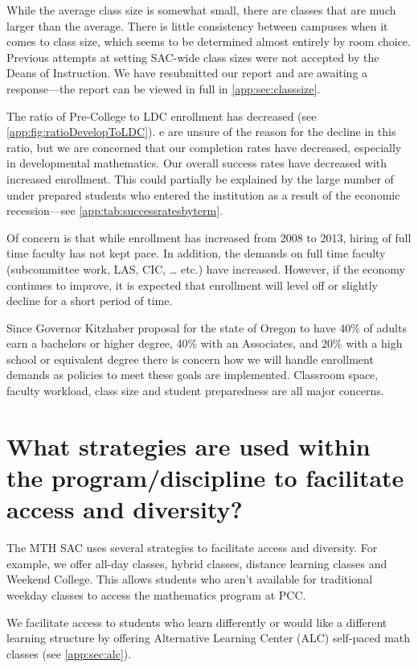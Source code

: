 While the average class size is somewhat small, there are classes that are much
larger than the average. There is little consistency between campuses when it
comes to class size, which seems to be determined almost entirely by room
choice. Previous attempts at setting SAC-wide class sizes were not accepted by
the Deans of Instruction. We have resubmitted our report and are awaiting a
response---the report \label{needs:page:classsize} can be viewed in full in \vref{app:sec:classsize}.

The ratio of Pre-College to LDC enrollment has decreased (see
\vref{app:fig:ratioDevelopToLDC}). e are unsure of the reason for the decline
in this ratio, but we are concerned that our completion rates have decreased,
especially in developmental mathematics. Our overall success rates have
decreased with increased enrollment.  This could partially be explained by the
large number of under prepared students who entered the institution as a result
of the economic recession---see \vref{app:tab:successratesbyterm}.

Of concern is that while enrollment has increased from 2008 to 2013, hiring of
full time faculty has not kept pace. In addition, the demands on full time
faculty (subcommittee work, LAS, CIC, {\ldots} etc.) have increased.   However,
if the economy continues to improve, it is expected that enrollment will level
off or slightly decline for a short period of time.

Since Governor Kitzhaber proposal for the state of Oregon to have 40\% of
adults earn a bachelors or higher degree, 40\% with an Associates, and 20\%
with a high school or equivalent degree there is concern how we will handle
enrollment demands as policies to meet these goals are implemented.
Classroom space, faculty workload, class size and student preparedness are all
major concerns.

\section{What strategies are used within the program/discipline to facilitate access and diversity?}
The MTH SAC uses several strategies to facilitate access and diversity. For
example, we offer all-day classes, hybrid classes, distance learning classes
and Weekend College. This allows students who aren't available for traditional
weekday classes to access the mathematics program at PCC. 

We facilitate access to students who learn differently or would like a
different learning structure by offering  Alternative Learning Center (ALC)
self-paced math classes (see \vref{app:sec:alc}).

